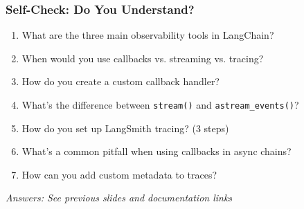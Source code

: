 \documentclass[aspectratio=169,11pt]{beamer}
\begin{document}
\begin{frame}
  \frametitle{Self-Check: Do You Understand?}

  \begin{enumerate}
    \setlength{\itemsep}{1pt}
    \item What are the three main observability tools in LangChain?
    \vspace{0.1cm}

    \item When would you use callbacks vs. streaming vs. tracing?
    \vspace{0.1cm}

    \item How do you create a custom callback handler?
    \vspace{0.1cm}

    \item What's the difference between \texttt{stream()} and \texttt{astream\_events()}?
    \vspace{0.1cm}

    \item How do you set up LangSmith tracing? (3 steps)
    \vspace{0.1cm}

    \item What's a common pitfall when using callbacks in async chains?
    \vspace{0.1cm}

    \item How can you add custom metadata to traces?
  \end{enumerate}

  \vspace{0.15cm}

  \small \textit{Answers: See previous slides and documentation links}
\end{frame}

\end{document}
